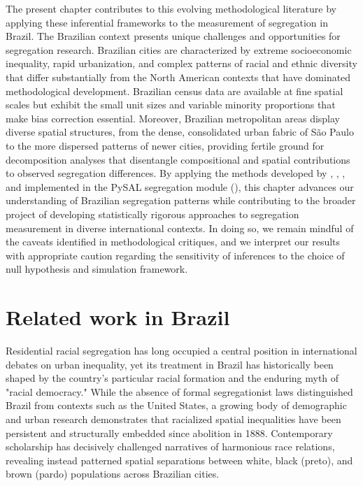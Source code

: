 \documentclass[12pt,a4paper]{article}
\begin{document}
The present chapter contributes to this evolving methodological literature by applying these inferential frameworks to the measurement of segregation in Brazil. The Brazilian context presents unique challenges and opportunities for segregation research. Brazilian cities are characterized by extreme socioeconomic inequality, rapid urbanization, and complex patterns of racial and ethnic diversity that differ substantially from the North American contexts that have dominated methodological development. Brazilian census data are available at fine spatial scales but exhibit the small unit sizes and variable minority proportions that make bias correction essential. Moreover, Brazilian metropolitan areas display diverse spatial structures, from the dense, consolidated urban fabric of São Paulo to the more dispersed patterns of newer cities, providing fertile ground for decomposition analyses that disentangle compositional and spatial contributions to observed segregation differences. By applying the methods developed by \cite{allen2015more}, \cite{lee2015bayesianinference}, \cite{rey2021comparative}, and implemented in the PySAL segregation module (\cite{cortes2020open}), this chapter advances our understanding of Brazilian segregation patterns while contributing to the broader project of developing statistically rigorous approaches to segregation measurement in diverse international contexts. In doing so, we remain mindful of the caveats identified in methodological critiques, and we interpret our results with appropriate caution regarding the sensitivity of inferences to the choice of null hypothesis and simulation framework.

\section{Related work in Brazil}\label{sec:related-work}

Residential racial segregation has long occupied a central position in international debates on urban inequality, yet its treatment in Brazil has historically been shaped by the country’s particular racial formation and the enduring myth of "racial democracy." While the absence of formal segregationist laws distinguished Brazil from contexts such as the United States, a growing body of demographic and urban research demonstrates that racialized spatial inequalities have been persistent and structurally embedded since abolition in 1888. Contemporary scholarship has decisively challenged narratives of harmonious race relations, revealing instead patterned spatial separations between white, black (preto), and brown (pardo) populations across Brazilian cities.
\end{document}
